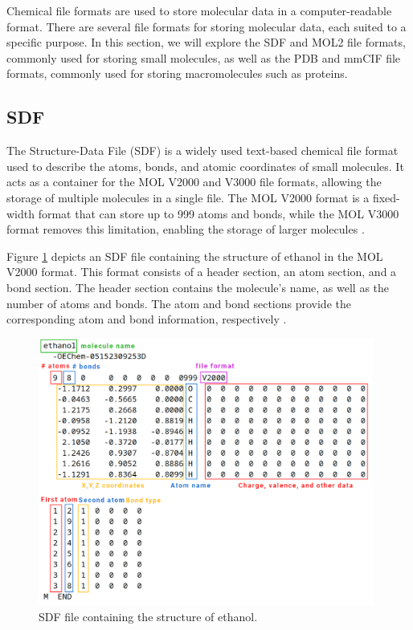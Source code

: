 \documentclass[
  digital,     %
  oneside,     %
  nosansbold,  %
  nocolorbold, %
  lof,         %
  lot,         %
]{fithesis4}
\begin{document}
Chemical file formats are used to store molecular data in a computer-readable format. There are several file formats for storing molecular data, each suited to a specific purpose. In this section, we will explore the SDF and MOL2 file formats, commonly used for storing small molecules, as well as the PDB and mmCIF file formats, commonly used for storing macromolecules such as proteins.

\subsection{SDF}
\label{subsection:sdf}

The Structure-Data File (SDF) is a widely used text-based chemical file format used to describe the atoms, bonds, and atomic coordinates of small molecules. It acts as a container for the MOL V2000 and V3000 file formats, allowing the storage of multiple molecules in a single file. The MOL V2000 format is a fixed-width format that can store up to 999 atoms and bonds, while the MOL V3000 format removes this limitation, enabling the storage of larger molecules \cite{wikipedia_ctfile,mdl_ctfile}.

Figure \ref{fig:sdf} depicts an SDF file containing the structure of ethanol in the MOL V2000 format. This format consists of a header section, an atom section, and a bond section. The header section contains the molecule's name, as well as the number of atoms and bonds. The atom and bond sections provide the corresponding atom and bond information, respectively \cite{belford2017anatomy}.

\begin{figure}[htbp]
  \begin{center}
    \includegraphics[width=11cm]{figures/sdf_file_format.png}
  \end{center}
  \caption{SDF file containing the structure of ethanol. \cite{belford2017anatomy}}
  \label{fig:sdf}
\end{figure}
\end{document}
